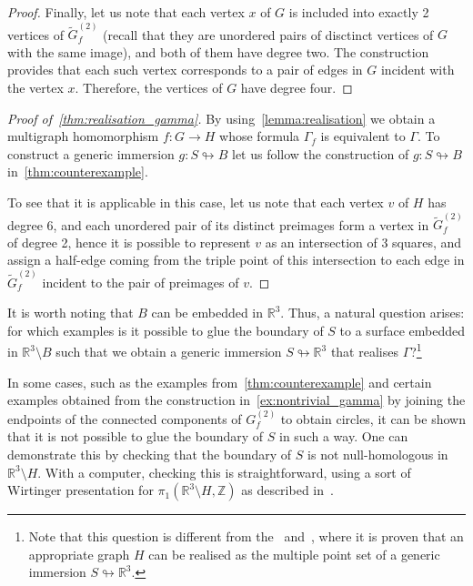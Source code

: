 \documentclass[a4paper,12pt,reqno,oneside]{amsart}
\theoremstyle{plain}
\theoremstyle{definition}
\theoremstyle{plain}
\newcommand{\from}{\colon}
\newcommand{\wt}[1]{\widetilde{#1}}
\newcommand{\R}{\mathbb{R}}
\newcommand{\Z}{\mathbb{Z}}
\begin{document}
\begin{proof}
  Finally, let us note that each vertex $x$ of $G$ is included into exactly 2 vertices of
  $\wt{G}_f^{(2)}$ (recall that they are unordered pairs of disctinct vertices of $G$ with the same
  image), and both of them have degree two. The construction provides that each such vertex
  corresponds to a pair of edges in $G$ incident with the vertex $x$. Therefore, the vertices of $G$
  have degree four.
\end{proof}

\begin{proof}[Proof of~\cref{thm:realisation_gamma}]
  By using~\cref{lemma:realisation} we obtain a multigraph homomorphism $f \from G \to H$ whose formula
  $\Gamma_f$ is equivalent to $\Gamma$. To construct a generic immersion $g \from S \looparrowright B$ let us
  follow the construction of $g \from S \looparrowright B$ in~\cref{thm:counterexample}.

  To see that it is applicable in this case, let us note that each vertex $v$ of $H$ has degree 6,
  and each unordered pair of its distinct preimages form a vertex in $\wt{G}^{(2)}_f$ of degree 2, hence
  it is possible to represent $v$ as an intersection of 3 squares, and assign a half-edge
  coming from the triple point of this intersection to each edge in $\wt{G}^{(2)}_f$ incident to the
  pair of preimages of $v$.
\end{proof}

It is worth noting that $B$ can be embedded in $\R^3$. Thus, a natural question arises: for which
examples is it possible to glue the boundary of $S$ to a surface embedded in $\R^3 \setminus B$ such
that we obtain a generic immersion $S \looparrowright \R^3$ that realises $\Gamma$?\footnote{Note
  that this question is different from the~\cite[Proposition 4.19]{carter_saito_book} and~\cite{li},
  where it is proven that an appropriate graph $H$ can be realised as the multiple point set of a generic
  immersion $S \looparrowright \R^3$.}

In some cases, such as the examples from~\cref{thm:counterexample} and certain examples obtained
from the construction in~\cref{ex:nontrivial_gamma} by joining the endpoints of the connected
components of $G^{(2)}_f$ to obtain circles, it can be shown that it is not possible to glue the
boundary of $S$ in such a way. One can demonstrate this by checking that the boundary of $S$ is not
null-homologous in $\R^3 \setminus H$. With a computer, checking this is straightforward, using a
sort of Wirtinger presentation for $\pi_1(\R^3 \setminus H, \Z)$ as described in~\cite[Proposition
9.1.9]{groupoids}.
\end{document}
